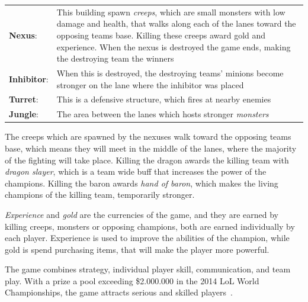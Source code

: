 \begin{table}[!h]
  \begin{tabular}{l p{13cm}}
    \textbf{Nexus}: & This building spawn \emph{creeps}, which are small monsters with low damage and health, that walks along each of the lanes toward the opposing teams base. Killing these creeps award gold and experience. When the nexus is destroyed the game ends, making the destroying team the winners\\
    \textbf{Inhibitor}: & When this is destroyed, the destroying teams' minions become stronger on the lane where the inhibitor was placed\\
    \textbf{Turret}: & This is a defensive structure, which fires at nearby enemies\\
    \textbf{Jungle}: & The area between the lanes which hosts stronger \emph{monsters}\\
  \end{tabular}
\end{table}

The creeps which are spawned by the nexuses walk toward the opposing teams base, which means they will meet in the middle of the lanes, where the majority of the fighting will take place. Killing the dragon awards the killing team with \emph{dragon slayer}, which is a team wide buff that increases the power of the champions. Killing the baron awards \emph{hand of baron}, which makes the living champions of the killing team, temporarily stronger.

\emph{Experience} and \emph{gold} are the currencies of the game, and they are earned by killing creeps, monsters or opposing champions, both are earned individually by each player. Experience is used to improve the abilities of the champion, while gold is spend purchasing items, that will make the player more powerful.

The game combines strategy, individual player skill, communication, and team play.
With a prize a pool exceeding \$2.000.000 in the 2014 LoL World Championships, the game attracts serious and skilled players~\cite{lolprize}.

